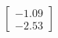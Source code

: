 \documentclass[preview]{standalone}
\begin{document}
\begin{align*}
\begin{bmatrix} -1.09 \\ -2.53 \end{bmatrix}
\end{align*}
\end{document}
